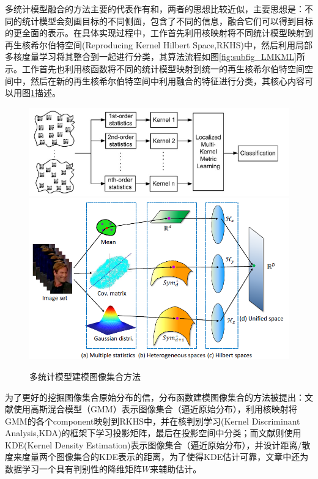 多统计模型融合的方法主要的代表作有\cite{Statistics_LMKML}和\cite{Statistics_HERML}，两者的思想比较近似，主要思想是：不同的统计模型会刻画目标的不同侧面，包含了不同的信息，融合它们可以得到目标的更全面的表示。在具体实现过程中，工作\cite{Statistics_LMKML}首先利用核映射将不同统计模型映射到再生核希尔伯特空间(Reproducing Kernel Hilbert Space,RKHS)中，然后利用局部多核度量学习将其整合到一起进行分类，其算法流程如图\ref{fig:subfig_LMKML}所示。工作\cite{Statistics_HERML}首先也利用核函数将不同的统计模型映射到统一的再生核希尔伯特空间空间中，然后在新的再生核希尔伯特空间中利用融合的特征进行分类，其核心内容可以用图\ref{fig:Multi_Stat}描述。
\begin{figure}[h]
  \centering
      {\includegraphics[width=0.51\linewidth]{source/Statistics_LMKML.png}}
  \hspace{1em}%
      {\includegraphics[width=0.45\linewidth]{source/Statistics_HERML.png}}
  \caption{多统计模型建模图像集合方法}
  \label{fig:Multi_Stat}
\end{figure}

为了更好的挖掘图像集合原始分布的信，分布函数建模图像集合的方法被提出：文献\cite{Statistics_DARG}使用高斯混合模型（GMM）表示图像集合（逼近原始分布），利用核映射将GMM的各个component映射到RKHS中，并在核判别学习(Kernel Discriminant Analysis,KDA)\cite{Kernel_KDA}的框架下学习投影矩阵，最后在投影空间中分类；而文献\cite{Statistics_BeyondGauss}则使用KDE(Kernel Density Estimation)表示图像集合（逼近原始分布），并设计距离/散度来度量两个图像集合的KDE表示的距离，为了使得KDE估计可靠，文章中还为数据学习一个具有判别性的降维矩阵$W$来辅助估计。

